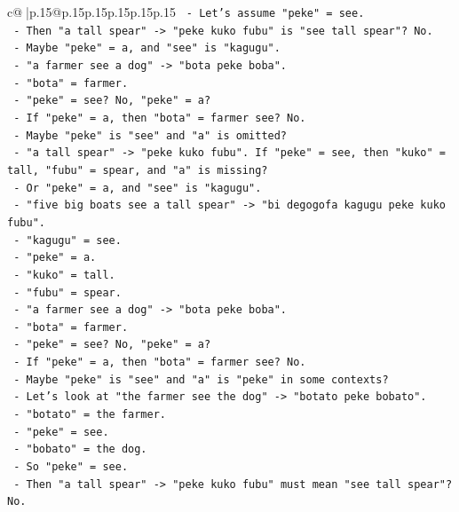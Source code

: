 \documentclass{article}
\begin{document}
{\begin{supertabular}{c@{$\;$}|p{.15\linewidth}@{}p{.15\linewidth}p{.15\linewidth}p{.15\linewidth}p{.15\linewidth}p{.15\linewidth}}
{{{\texttt{        {-} Let's assume "peke" = see.} \\
\texttt{        {-} Then "a tall spear" {-}> "peke kuko fubu" is "see tall spear"? No.} \\
\texttt{        {-} Maybe "peke" = a, and "see" is "kagugu".} \\
\texttt{        {-} "a farmer see a dog" {-}> "bota peke boba".} \\
\texttt{        {-} "bota" = farmer.} \\
\texttt{        {-} "peke" = see? No, "peke" = a?} \\
\texttt{        {-} If "peke" = a, then "bota" = farmer see? No.} \\
\texttt{        {-} Maybe "peke" is "see" and "a" is omitted?} \\
\texttt{        {-} "a tall spear" {-}> "peke kuko fubu". If "peke" = see, then "kuko" = tall, "fubu" = spear, and "a" is missing?} \\
\texttt{        {-} Or "peke" = a, and "see" is "kagugu".} \\
\texttt{        {-} "five big boats see a tall spear" {-}> "bi degogofa kagugu peke kuko fubu".} \\
\texttt{        {-} "kagugu" = see.} \\
\texttt{        {-} "peke" = a.} \\
\texttt{        {-} "kuko" = tall.} \\
\texttt{        {-} "fubu" = spear.} \\
\texttt{        {-} "a farmer see a dog" {-}> "bota peke boba".} \\
\texttt{        {-} "bota" = farmer.} \\
\texttt{        {-} "peke" = see? No, "peke" = a?} \\
\texttt{        {-} If "peke" = a, then "bota" = farmer see? No.} \\
\texttt{        {-} Maybe "peke" is "see" and "a" is "peke" in some contexts?} \\
\texttt{        {-} Let's look at "the farmer see the dog" {-}> "botato peke bobato".} \\
\texttt{        {-} "botato" = the farmer.} \\
\texttt{        {-} "peke" = see.} \\
\texttt{        {-} "bobato" = the dog.} \\
\texttt{        {-} So "peke" = see.} \\
\texttt{        {-} Then "a tall spear" {-}> "peke kuko fubu" must mean "see tall spear"? No.} \\
}}}
\end{supertabular}}
\end{document}
